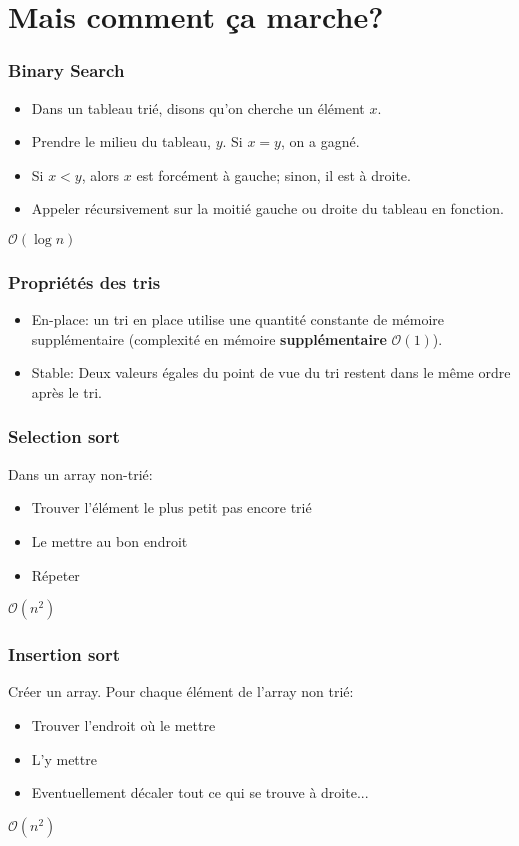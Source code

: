 \documentclass[8pt,aspectratio=169]{beamer}
\begin{document}
\section{Mais comment ça marche?}

\begin{frame}
\frametitle{Binary Search}
\begin{itemize}
	\item Dans un tableau trié, disons qu'on cherche un élément $x$.
	\item Prendre le milieu du tableau, $y$. Si $x=y$, on a gagné.
	\item Si $x < y$, alors $x$ est forcément à gauche; sinon, il est à droite.
	\item Appeler récursivement sur la moitié gauche ou droite du tableau en fonction.
\end{itemize}
$\mathcal{O}(\log n)$
\end{frame}

\begin{frame}
\frametitle{Propriétés des tris}
\begin{itemize}
	\item En-place: un tri en place utilise une quantité constante de mémoire supplémentaire (complexité en mémoire \textbf{supplémentaire} $\mathcal{O}(1)$).
	\item Stable: Deux valeurs égales du point de vue du tri restent dans le même ordre après le tri.
\end{itemize}
\end{frame}

\begin{frame}
\frametitle{Selection sort}
Dans un array non-trié:
\begin{itemize}
	\item Trouver l'élément le plus petit pas encore trié
	\item Le mettre au bon endroit
	\item Répeter
\end{itemize}
$\mathcal{O}(n^2)$
\end{frame}

\begin{frame}
\frametitle{Insertion sort}
Créer un array. Pour chaque élément de l'array non trié:
\begin{itemize}
	\item Trouver l'endroit où le mettre
	\item L'y mettre
	\item Eventuellement décaler tout ce qui se trouve à droite...
\end{itemize}
$\mathcal{O}(n^2)$
\end{frame}
\end{document}
